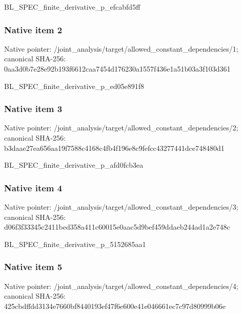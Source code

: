 \documentclass[10pt,a4paper]{article}
\begin{document}
\begingroup\raggedright\sloppy BL\_\allowbreak{}SPEC\_\allowbreak{}finite\_\allowbreak{}derivative\_\allowbreak{}p\_\allowbreak{}efcabfd5ff\par\endgroup

\subsubsection{Native item 2}
Native pointer: /joint\_\allowbreak{}analysis/target/allowed\_\allowbreak{}constant\_\allowbreak{}dependencies/1; canonical SHA-256: 0aa3d0b7e28e92b193f6612caa7454d176230a1557f436e1a51b03a3f103d361

\begingroup\raggedright\sloppy BL\_\allowbreak{}SPEC\_\allowbreak{}finite\_\allowbreak{}derivative\_\allowbreak{}p\_\allowbreak{}ed05e891f8\par\endgroup

\subsubsection{Native item 3}
Native pointer: /joint\_\allowbreak{}analysis/target/allowed\_\allowbreak{}constant\_\allowbreak{}dependencies/2; canonical SHA-256: b3daae27ea656aa19f7588c4168c4fb4f196e8c9fefcc43277441dce748480d1

\begingroup\raggedright\sloppy BL\_\allowbreak{}SPEC\_\allowbreak{}finite\_\allowbreak{}derivative\_\allowbreak{}p\_\allowbreak{}afd0fcb3ea\par\endgroup

\subsubsection{Native item 4}
Native pointer: /joint\_\allowbreak{}analysis/target/allowed\_\allowbreak{}constant\_\allowbreak{}dependencies/3; canonical SHA-256: d06f3f33345c2411bed358a411c60015e0aac5d9bef459ddaeb244ad1a2e748c

\begingroup\raggedright\sloppy BL\_\allowbreak{}SPEC\_\allowbreak{}finite\_\allowbreak{}derivative\_\allowbreak{}p\_\allowbreak{}5152685aa1\par\endgroup

\subsubsection{Native item 5}
Native pointer: /joint\_\allowbreak{}analysis/target/allowed\_\allowbreak{}constant\_\allowbreak{}dependencies/4; canonical SHA-256: 425cbdffdd3134e7660bf8440193ef47f6e600e41e046661ec7c97d80999b06e
\end{document}
